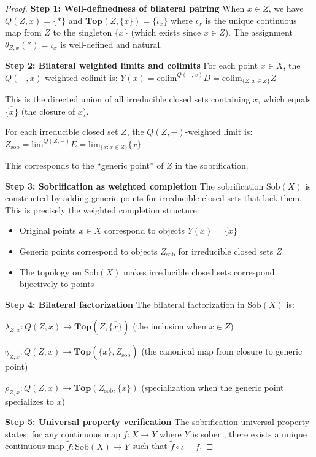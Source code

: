 \documentclass[11pt]{article}
\theoremstyle{plain}
\theoremstyle{definition}
\theoremstyle{remark}
\newcommand{\colim}{\mathrm{colim}}
\renewcommand{\lim}{\mathrm{lim}}
\begin{document}
\begin{proof}
\textbf{Step 1: Well-definedness of bilateral pairing}
When $x \in Z$, we have $Q(Z, x) = \{*\}$ and $\mathbf{Top}(Z, \{x\}) = \{\iota_x\}$ where $\iota_x$ is the unique continuous map from $Z$ to the singleton $\{x\}$ (which exists since $x \in Z$). The assignment $\theta_{Z,x}(*) = \iota_x$ is well-defined and natural.

\textbf{Step 2: Bilateral weighted limits and colimits}
For each point $x \in X$, the $Q(-, x)$-weighted colimit is:
$Y(x) = \colim^{Q(-, x)} D = \colim_{\{Z : x \in Z\}} Z$

This is the directed union of all irreducible closed sets containing $x$, which equals $\overline{\{x\}}$ (the closure of $x$).

For each irreducible closed set $Z$, the $Q(Z, -)$-weighted limit is:
$Z_{\text{sob}} = \lim^{Q(Z, -)} E = \lim_{\{x : x \in Z\}} \{x\}$

This corresponds to the ``generic point'' of $Z$ in the sobrification.

\textbf{Step 3: Sobrification as weighted completion}
The sobrification $\text{Sob}(X)$ is constructed by adding generic points for irreducible closed sets that lack them. This is precisely the weighted completion structure:

\begin{itemize}
\item Original points $x \in X$ correspond to objects $Y(x) = \overline{\{x\}}$
\item Generic points correspond to objects $Z_{\text{sob}}$ for irreducible closed sets $Z$
\item The topology on $\text{Sob}(X)$ makes irreducible closed sets correspond bijectively to points
\end{itemize}

\textbf{Step 4: Bilateral factorization}
The bilateral factorization in $\text{Sob}(X)$ is:

$\lambda_{Z,x} : Q(Z, x) \to \mathbf{Top}(Z, \overline{\{x\}})$ (the inclusion when $x \in Z$)

$\gamma_{Z,x} : Q(Z, x) \to \mathbf{Top}(\overline{\{x\}}, Z_{\text{sob}})$ (the canonical map from closure to generic point)

$\rho_{Z,x} : Q(Z, x) \to \mathbf{Top}(Z_{\text{sob}}, \{x\})$ (specialization when the generic point specializes to $x$)

\textbf{Step 5: Universal property verification}
The sobrification universal property states: for any continuous map $f : X \to Y$ where $Y$ is sober \cite{johnstone1982stone}, there exists a unique continuous map $\tilde{f} : \text{Sob}(X) \to Y$ such that $\tilde{f} \circ \iota = f$.


\end{proof}
\end{document}
